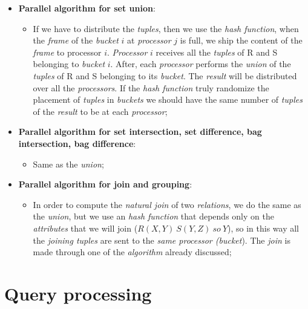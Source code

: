 \documentclass{article}
\begin{document}
\begin{itemize}
\begin{itemize}
\end{itemize}
\item \textbf{Parallel algorithm for set union}:
\begin{itemize}
\item If we have to distribute the \emph{tuples}, then we use the \emph{hash function}, when the \emph{frame} of the \emph{bucket} $i$ at \emph{processor} $j$ is full, we ship the content of the \emph{frame} to processor $i$. \emph{Processor} $i$ receives all the \emph{tuples} of R and S belonging to \emph{bucket} $i$. After, each \emph{processor} performs the \emph{union} of the \emph{tuples} of R and S belonging to its \emph{bucket}. The \emph{result} will be distributed over all the \emph{processors}. If the \emph{hash function} truly randomize the placement of \emph{tuples} in \emph{buckets} we should have the same number of \emph{tuples} of the \emph{result} to be at each \emph{processor};
\end{itemize}
\item \textbf{Parallel algorithm for set intersection, set difference, bag intersection, bag difference}:
\begin{itemize}
\item Same as the \emph{union};
\end{itemize}
\item \textbf{Parallel algorithm for join and grouping}:
\begin{itemize}
\item In order to compute the \emph{natural join} of two \emph{relations}, we do the same as the \emph{union}, but we use an \emph{hash function} that depends only on the \emph{attributes} that we will join ($R(X,Y)\ S(Y,Z)\ so\ Y$), so in this way all the \emph{joining tuples} are sent to the \emph{same processor (bucket}). The \emph{join} is made through one of the \emph{algorithm} already discussed;
\end{itemize}
\end{itemize}
\section{Query processing}
\end{document}
